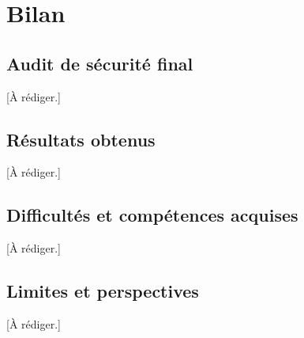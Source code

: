 \chapter{Bilan}
\label{chap:bilan}

\section{Audit de sécurité final}
[À rédiger.]

\section{Résultats obtenus}
[À rédiger.]

\section{Difficultés et compétences acquises}
[À rédiger.]

\section{Limites et perspectives}
[À rédiger.]

\clearpage

